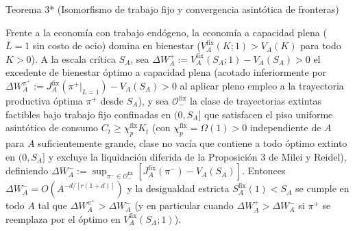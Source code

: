 \documentclass[11pt,letterpaper]{article}
\theoremstyle{plain}
\newtheorem*{namedthm}{\protect\namedthmname}
\newcommand{\namedthmname}{}
\newenvironment{thm_box}[1]{\renewcommand{\namedthmname}{#1}\begin{namedthm}}{\end{namedthm}}
\begin{document}
\begin{thm_box}{Teorema 3* (Isomorfismo de trabajo fijo y convergencia asintótica de fronteras)}
\begin{enumerate}
Frente a la economía con trabajo endógeno, la economía a capacidad plena ($\overline{L}=1$ sin costo de ocio) domina en bienestar ($V_A^{\mathrm{fix}}(K;1) > V_A(K)$ para todo $K>0$). A la escala crítica $S_A$, sea $\Delta W_A^+ := V_A^{\mathrm{fix}}(S_A;1) - V_A(S_A) > 0$ el excedente de bienestar óptimo a capacidad plena (acotado inferiormente por $\Delta W_A^{\pi^+} := J_A^{\mathrm{fix}}(\pi^+|_{L=1}) - V_A(S_A) > 0$ al aplicar pleno empleo a la trayectoria productiva óptima $\pi^+$ desde $S_A$), y sea $\mathcal{O}_-^{\mathrm{fix}}$ la clase de trayectorias extintas factibles bajo trabajo fijo confinadas en $(0,S_A]$ que satisfacen el piso uniforme asintótico de consumo $C_t \ge \chi_p^{\mathrm{fix}} K_t$ (con $\chi_p^{\mathrm{fix}}=\Omega(1)>0$ independiente de $A$ para $A$ suficientemente grande, clase no vacía que contiene a todo óptimo extinto en $(0,S_A]$ y excluye la liquidación diferida de la Proposición 3 de Milei y Reidel), definiendo $\Delta W_A^- := \sup_{\pi^-\in\mathcal{O}_-^{\mathrm{fix}}}[J_A^{\mathrm{fix}}(\pi^-) - V_A(S_A)]$. Entonces $\Delta W_A^- = O(A^{-d/[r(1+d)]})$ y la desigualdad estricta $S_A^{\mathrm{fix}}(1) < S_A$ se cumple en todo $A$ tal que $\Delta W_A^{\pi^+} > \Delta W_A^-$ (y en particular cuando $\Delta W_A^+ > \Delta W_A^-$ si $\pi^+$ se reemplaza por el óptimo en $V_A^{\mathrm{fix}}(S_A;1)$).
\end{enumerate}
\end{thm_box}
\end{document}

